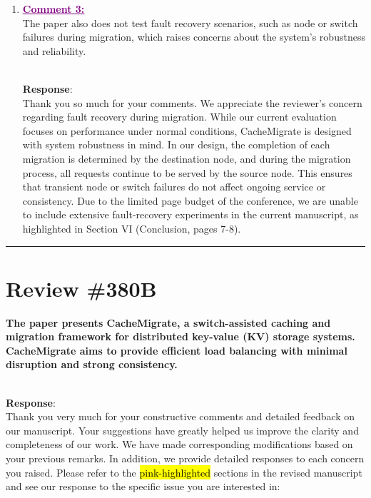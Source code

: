 \documentclass[11pt]{article}
\newcounter{reviewer}
\newcommand{\reviewersection}[1]{
    \bigskip
    \hrule
    \section*{#1}
}
\newenvironment{reply}
   {\medskip \noindent \color{blue} \begin{sf}\\ \textbf{Response}:\\  }
   {\medskip \par \end{sf}}
\newcommand{\comment}[1]{\textcolor{purple}{\textbf{\underline{Comment #1:}}}\\}
\DeclareRobustCommand{\thanksfor}[1]{Thank you so much for #1}
\DeclareRobustCommand{\hlRevB}[1]{{\sethlcolor{pink}\hl{#1}}}%
\begin{document}
\begin{enumerate}
    \item \comment{3} The paper also does not test fault recovery scenarios, such as node or switch failures during migration, which raises concerns about the system's robustness and reliability.
          \begin{reply}
              \thanksfor{your comments}. We appreciate the reviewer's concern regarding fault recovery during migration. While our current evaluation focuses on performance under normal conditions, CacheMigrate is designed with system robustness in mind. In our design, the completion of each migration is determined by the destination node, and during the migration process, all requests continue to be served by the source node. This ensures that transient node or switch failures do not affect ongoing service or consistency. Due to the limited page budget of the conference, we are unable to include extensive fault-recovery experiments in the current manuscript, as highlighted in Section VI (Conclusion, pages 7-8).
          \end{reply}
\end{enumerate}

\reviewersection{Review \#380B}
\textbf{The paper presents CacheMigrate, a switch-assisted caching and migration framework for distributed key-value (KV) storage systems. CacheMigrate aims to provide efficient load balancing with minimal disruption and strong consistency.}

\begin{reply}
    Thank you very much for your constructive comments and detailed feedback on our manuscript. Your suggestions have greatly helped us improve the clarity and completeness of our work. We have made corresponding modifications based on your previous remarks. In addition, we provide detailed responses to each concern you raised. Please refer to the \hlRevB{pink-highlighted} sections in the revised manuscript and see our response to the specific issue you are interested in:
\end{reply}
\end{document}
